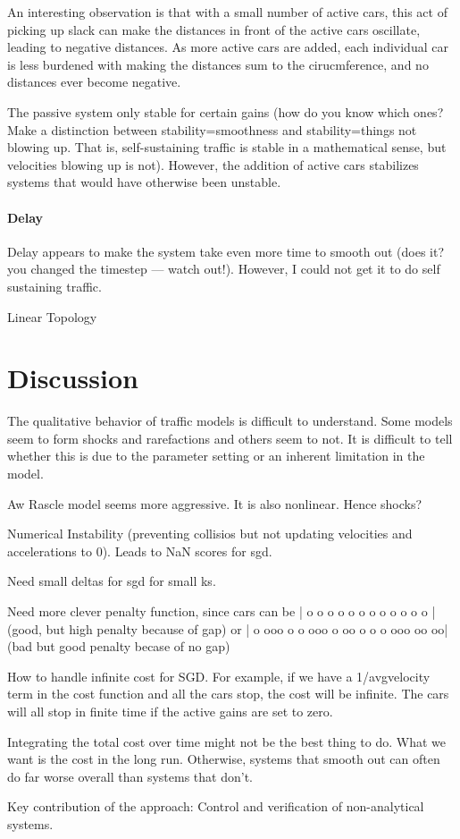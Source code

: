 \documentclass[10pt,twocolumn]{article}
\begin{document}
An interesting observation is that with a small number of active cars, this act of picking up slack can make the distances in front of the active cars oscillate, leading to negative distances. As more active cars are added, each individual car is less burdened with making the distances sum to the cirucmference, and no distances ever become negative.

The passive system only stable for certain gains (how do you know which ones? Make a distinction between stability=smoothness and stability=things not blowing up. That is, self-sustaining traffic is stable in a mathematical sense, but velocities blowing up is not). However, the addition of active cars stabilizes systems that would have otherwise been unstable.

\paragraph{Delay}

Delay appears to make the system take even more time to smooth out (does it? you changed the timestep --- watch out!). However, I could not get it to do self sustaining traffic.



Linear Topology


\section{Discussion}  

The qualitative behavior of traffic models is difficult to understand. Some models seem to form shocks and rarefactions and others seem to not. It is difficult to tell whether this is due to the parameter setting or an inherent limitation in the model.

Aw Rascle model seems more aggressive. It is also nonlinear. Hence shocks?

Numerical Instability (preventing collisios but not updating velocities and accelerations to 0). Leads to NaN scores for sgd.

Need small deltas for sgd for small ks.

Need more clever penalty function, since cars can be | o o o o o o o o o           o o o | (good, but high penalty because of gap) or | o ooo o o ooo o oo o o o ooo oo  oo| (bad but good penalty becase of no gap)

How to handle infinite cost for SGD. For example, if we have a 1/avgvelocity term in the cost function and all the cars stop, the cost will be infinite. The cars will all stop in finite time if the active gains are set to zero.

Integrating the total cost over time might not be the best thing to do. What we want is the cost in the long run. Otherwise, systems that smooth out can often do far worse overall than systems that don't.

Key contribution of the approach: Control and verification of non-analytical systems.
\end{document}
